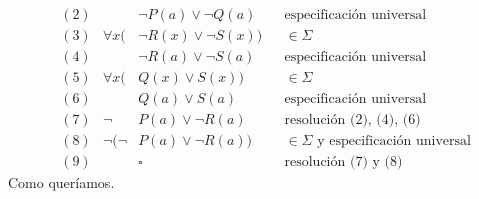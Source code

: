 \begin{enumerate}
\begin{enumerate}[label=\alph*)]
\begin{align*}
    &(2) & &\neg P(a)\lor \neg Q(a)& &\text{especificación universal} \\
    &(3) & \forall x(&\neg R(x)\lor \neg S(x)) &&\in  \Sigma \\
    &(4) & &\neg R(a)\lor \neg S(a)& &\text{especificación universal} \\
    &(5) & \forall x(&Q(x)\lor S(x)) &&\in  \Sigma \\
    &(6) & &Q(a)\lor S(a)& &\text{especificación universal}\\
    &(7) & \neg &P(a)\lor \neg R(a)& &\text{resolución (2), (4), (6)} \\
    &(8) &  \neg (\neg &P(a)\lor \neg R(a)) &&\in  \Sigma \text{ y especificación universal}\\
    &(9) & & \square& &\text{resolución  (7) y (8)}
\end{align*}
Como queríamos.
\end{enumerate}
\end{enumerate}